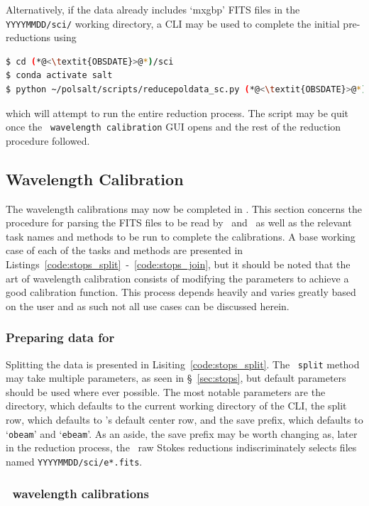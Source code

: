 Alternatively, if the data already includes `mxgbp' \gls{FITS} files in the \texttt{YYYYMMDD/sci/} working directory, a \gls{CLI} may be used to complete the initial pre-reductions using
\begin{lstlisting}[language=bash]
$ cd (*@<\textit{OBSDATE}>@*)/sci
$ conda activate salt
$ python ~/polsalt/scripts/reducepoldata_sc.py (*@<\textit{OBSDATE}>@*)
\end{lstlisting}
{\parskip=0pt which} will attempt to run the entire reduction process. The script may be quit once the \polsalt\ \texttt{wavelength calibration} \gls{GUI} opens and the rest of the reduction procedure followed.

\subsection{Wavelength Calibration} \label{subsec:reduc_wav}

The wavelength calibrations may now be completed in \iraf. This section concerns the procedure for parsing the \gls{FITS} files to be read by \iraf\ and \polsalt\ as well as the relevant task names and methods to be run to complete the calibrations. A base working case of each of the tasks and methods are presented in Listings~\ref{code:stops_split}~-~\ref{code:stops_join}, but it should be noted that the art of wavelength calibration consists of modifying the parameters to achieve a good calibration function. This process depends heavily and varies greatly based on the user and as such not all use cases can be discussed herein.

\subsubsection{Preparing data for \iraf}

Splitting the data is presented in Lisiting~\ref{code:stops_split}. The \stops\ \texttt{split} method may take multiple parameters, as seen in \S~\ref{sec:stops}, but default parameters should be used where ever possible. The most notable parameters are the directory, which defaults to the current working directory of the \gls{CLI}, the split row, which defaults to \polsalt's default center row, and the save prefix, which defaults to `\texttt{obeam}' and `\texttt{ebeam}'. As an aside, the save prefix may be worth changing as, later in the reduction process, the \polsalt\ raw Stokes reductions indiscriminately selects files named \texttt{YYYYMMDD/sci/e*.fits}.

\subsubsection{\iraf\ wavelength calibrations}


